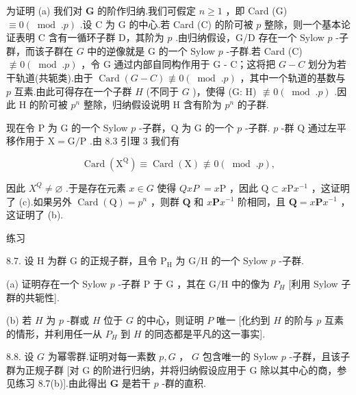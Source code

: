 \documentclass[10pt]{article}
\begin{document}
为证明 (a) 我们对 \(\mathbf{G}\) 的阶作归纳.我们可假定 \(n \geq  1\) ，即 Card (G) \(\equiv  0\left( {{\;\operatorname{mod}\;.}p}\right)\) .设 \(\mathrm{C}\) 为 \(\mathrm{G}\) 的中心.若 Card (C) 的阶可被 \(p\) 整除，则一个基本论证表明 \(\mathrm{C}\) 含有一循环子群 D，其阶为 \(p\) .由归纳假设，G/D 存在一个 Sylow \(p\) -子群，而该子群在 \(G\) 中的逆像就是 G 的一个 Sylow \(p\) -子群.若 Card (C) \(\text{ ≢ } 0\left( {{\;\operatorname{mod}\;.}p}\right)\) ，令 G 通过内部自同构作用于 G - C；这将把 \(G - C\) 划分为若干轨道(共轭类).由于 \(\operatorname{Card}\left( {G - C}\right)  \text{ ≢ } 0\left( {{\;\operatorname{mod}\;.}p}\right)\) ，其中一个轨道的基数与 \(p\) 互素.由此可得存在一个子群 \(H\) (不同于 \(G\) )，使得 (G: H) \(\text{ ≢ } 0\left( {{\;\operatorname{mod}\;.}p}\right)\) .因此 \(\mathrm{H}\) 的阶可被 \({p}^{n}\) 整除，归纳假设说明 \(\mathrm{H}\) 含有阶为 \({p}^{n}\) 的子群.

现在令 P 为 G 的一个 Sylow \(p\) -子群，Q 为 G 的一个 \(p\) -子群. \(p\) -群 \(\mathrm{Q}\) 通过左平移作用于 \(\mathrm{X} = \mathrm{G}/\mathrm{P}\) .由 8.3 引理 3 我们有

\[
\operatorname{Card}\left( {\mathrm{X}}^{\mathrm{Q}}\right)  \equiv  \operatorname{Card}\left( \mathrm{X}\right)  \text{ ≢ } 0\left( {\;\operatorname{mod}\;.p}\right) ,
\]

因此 \({X}^{Q} \neq  \varnothing\) .于是存在元素 \(x \in  G\) 使得 \({QxP} \; = x\mathrm{P}\) ，因此 \(\mathrm{Q} \subset  x\mathrm{P}{x}^{-1}\) ，这证明了 (c).如果另外 \(\operatorname{Card}\left( \mathrm{Q}\right)  = {p}^{n}\) ，则群 \(\mathbf{Q}\) 和 \(x\mathbf{P}{x}^{-1}\) 阶相同，且 \(\mathbf{Q} = x\mathbf{P}{x}^{-1}\) ，这证明了 (b).

练习

8.7. 设 \(\mathrm{H}\) 为群 \(\mathrm{G}\) 的正规子群，且令 \({\mathrm{P}}_{\mathrm{H}}\) 为 \(\mathrm{G}/\mathrm{H}\) 的一个 Sylow \(p\) -子群.

(a) 证明存在一个 Sylow \(p\) -子群 \(\mathrm{P}\) 于 \(\mathrm{G}\) ，其在 \(\mathrm{G}/\mathrm{H}\) 中的像为 \({P}_{H}\) [利用 Sylow 子群的共轭性].

(b) 若 \(H\) 为 \(p\) -群或 \(H\) 位于 \(G\) 的中心，则证明 \(P\) 唯一 [化约到 \(H\) 的阶与 \(p\) 互素的情形，并利用任一从 \({P}_{H}\) 到 \(H\) 的同态都是平凡的这一事实].

8.8. 设 \(G\) 为幂零群.证明对每一素数 \(p,G\) ， \(G\) 包含唯一的 Sylow \(p\) -子群，且该子群为正规子群 [对 G 的阶进行归纳，并将归纳假设应用于 G 除以其中心的商，参见练习 8.7(b)].由此得出 \(\mathbf{G}\) 是若干 \(p\) -群的直积.
\end{document}
